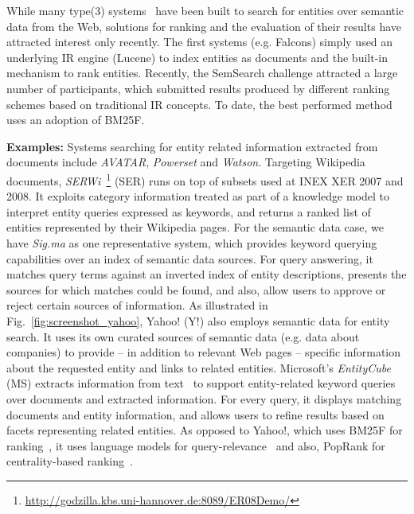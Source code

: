 While many type(3) systems~\cite{DBLP:journals/ijswis/ChengQ09,DBLP:journals/ws/HoganHUKPD11,DBLP:journals/ws/TummarelloCCDDD10,DBLP:journals/ws/TranWH09} have been built to search for entities over semantic data from the Web, solutions for ranking and the evaluation of their results have attracted interest only recently. The first systems (e.g. Falcons) simply used an underlying IR engine (Lucene) to index entities as documents and the built-in mechanism to rank entities. Recently, the SemSearch challenge attracted a large number of participants, which submitted results produced by different ranking schemes based on traditional IR concepts. To date, the best performed method~\cite{DBLP:conf/semweb/BlancoMV11} uses an adoption of BM25F. 


\textbf{Examples:}
Systems searching for entity related information extracted from documents include \emph{AVATAR}, \emph{Powerset} and \emph{Watson}. Targeting Wikipedia documents, \emph{SERWi}~\footnote{\url{http://godzilla.kbs.uni-hannover.de:8089/ER08Demo/}} (SER) runs on top of subsets used at INEX XER 2007 and 2008. It exploits category information treated as part of a knowledge model to interpret entity queries expressed as keywords, and returns a ranked list of entities represented by their Wikipedia pages. For the semantic data case, we have \emph{Sig.ma} as one representative system, which provides keyword querying capabilities over an index of semantic data sources. For query answering, it matches query terms against an inverted index of entity descriptions, presents the sources for which matches could be found, and also, allow users to approve or reject certain sources of information. As illustrated in Fig.~\ref{fig:screenshot_yahoo}, Yahoo! (Y!) also employs semantic data for entity search. It uses its own curated sources of semantic data (e.g. data about companies) to provide -- in addition to relevant Web pages -- specific information about the requested entity and links to related entities. Microsoft's \emph{EntityCube} (MS) extracts information from text~\cite{DBLP:conf/www/ZhuNLZW09} to support entity-related keyword queries over documents and extracted information. For every query, it displays matching documents and entity information, and allows users to refine results based on facets representing related entities. As opposed to Yahoo!, which uses BM25F for ranking~\cite{DBLP:conf/semweb/BlancoMV11}, it uses language models for query-relevance~\cite{DBLP:conf/www/NieMSWM07} and also, PopRank for centrality-based ranking~\cite{DBLP:conf/www/NieZWM05}. 


